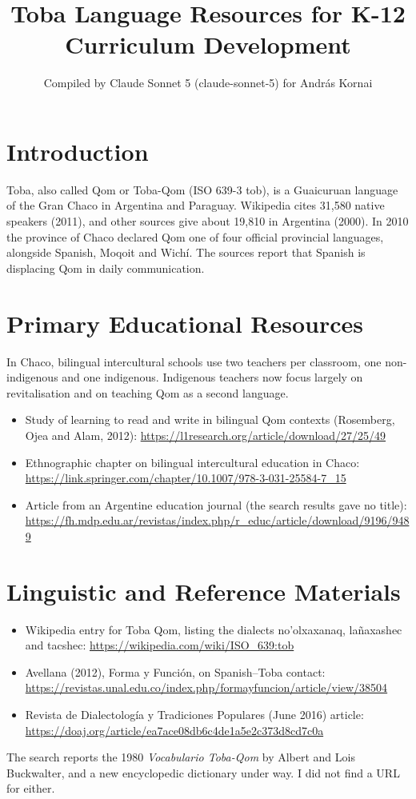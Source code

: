 \documentclass[12pt]{article}
\title{Toba Language Resources for K-12 Curriculum Development}
\author{Compiled by Claude Sonnet 5 (claude-sonnet-5) for Andr\'as Kornai}
\date{}
\begin{document}
\maketitle

\section{Introduction}
Toba, also called Qom or Toba-Qom (ISO 639-3 tob), is a Guaicuruan language of the Gran Chaco in Argentina and Paraguay. Wikipedia cites 31,580 native speakers (2011), and other sources give about 19,810 in Argentina (2000). In 2010 the province of Chaco declared Qom one of four official provincial languages, alongside Spanish, Moqoit and Wich\'i. The sources report that Spanish is displacing Qom in daily communication.

\section{Primary Educational Resources}
In Chaco, bilingual intercultural schools use two teachers per classroom, one non-indigenous and one indigenous. Indigenous teachers now focus largely on revitalisation and on teaching Qom as a second language.
\begin{itemize}
\item Study of learning to read and write in bilingual Qom contexts (Rosemberg, Ojea and Alam, 2012): \url{https://l1research.org/article/download/27/25/49}
\item Ethnographic chapter on bilingual intercultural education in Chaco: \url{https://link.springer.com/chapter/10.1007/978-3-031-25584-7_15}
\item Article from an Argentine education journal (the search results gave no title): \url{https://fh.mdp.edu.ar/revistas/index.php/r_educ/article/download/9196/9489}
\end{itemize}

\section{Linguistic and Reference Materials}
\begin{itemize}
\item Wikipedia entry for Toba Qom, listing the dialects no'olxaxanaq, lañaxashec and tacshec: \url{https://wikipedia.com/wiki/ISO_639:tob}
\item Avellana (2012), Forma y Funci\'on, on Spanish--Toba contact: \url{https://revistas.unal.edu.co/index.php/formayfuncion/article/view/38504}
\item Revista de Dialectolog\'ia y Tradiciones Populares (June 2016) article: \url{https://doaj.org/article/ea7ace08db6c4de1a5e2c373d8cd7c0a}
\end{itemize}
The search reports the 1980 \emph{Vocabulario Toba-Qom} by Albert and Lois Buckwalter, and a new encyclopedic dictionary under way. I did not find a URL for either.
\end{document}
